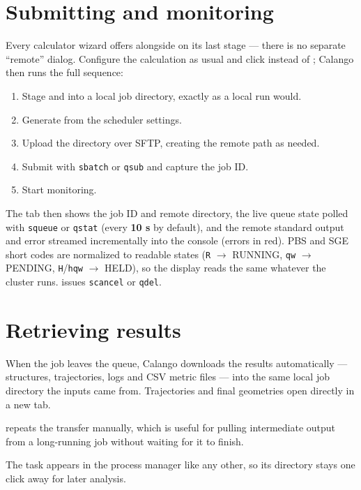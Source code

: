 \section{Submitting and monitoring}

Every calculator wizard offers  alongside  on its last stage --- there is no separate ``remote'' dialog.
Configure the calculation as usual and click  instead of
; Calango then runs the full sequence:

\begin{enumerate}
  \item Stage  and  into a local job
    directory, exactly as a local run would.
  \item Generate  from the scheduler settings.
  \item Upload the directory over SFTP, creating the remote path as needed.
  \item Submit with \texttt{sbatch} or \texttt{qsub} and capture the job ID.
  \item Start monitoring.
\end{enumerate}

The  tab then shows the job ID and remote directory, the
live queue state polled with \texttt{squeue} or \texttt{qstat} (every
\textbf{10 s} by default), and the remote standard output and error
streamed incrementally into the console (errors in red). PBS and SGE short
codes are normalized to readable states (\texttt{R} $\to$ RUNNING,
\texttt{qw} $\to$ PENDING, \texttt{H}/\texttt{hqw} $\to$ HELD), so the
display reads the same whatever the cluster runs.  issues
\texttt{scancel} or \texttt{qdel}.

\section{Retrieving results}

When the job leaves the queue, Calango downloads the results automatically
--- structures, trajectories, logs and CSV metric files --- into the same
local job directory the inputs came from. Trajectories and final geometries
open directly in a new tab.

 repeats the transfer manually, which is useful for
pulling intermediate output from a long-running job without waiting for it
to finish.

The task appears in the process manager like any other, so its directory
stays one click away for later analysis.
